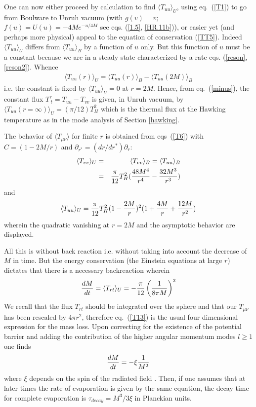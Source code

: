 \documentclass[12pt,oneside]{report}
\begin{document}
One can now either proceed by calculation to find $ \langle T_ {uu} \rangle _{U}
$,  using eq.~(\ref{T1}) to go from Boulware to Unruh vacuum (with $ g(v) = v; $ $
f(u) = U(u) = - 4M e^{-u/4M}$
 see eqs. (\ref{1.5}, \ref{HR.11b})), or easier yet (and perhaps more physical)
appeal to the equation of conservation (\ref{TT5}). Indeed $\langle T_{uu} \rangle
_{U} $ differs from $\langle T_ {uu} \rangle _{B}$  by a function of $ u$ only.
But this function of $u$ must be a constant because we are in a steady state
characterized by a rate eqs. (\ref{reson}, \ref{reson2}).  Whence
\begin{eqnarray} \langle T_{uu}(r) \rangle _U = \langle T_{uu} (r) \rangle _{B}
- \langle T_{uu}(2 M) \rangle _{B}
 \label {4.54}  \end{eqnarray} i.e. the constant is fixed by $ \langle T_{uu}
\rangle _{U} = 0 $ at $ r = 2M$.  Hence, from eq.~(\ref{minus}), the constant
flux  $ T^r_{\ t}  = T_{uu} - T_{vv}$ is  given, in Unruh vacuum,
 by $\langle T_{uu}(r=\infty) \rangle _{U} = (\pi/12)T^2_H$ which is the thermal
flux at the Hawking temperature as in the mode analysis of Section \ref{hawking}.

The behavior of  $ \langle T_{\mu\nu} \rangle $ for finite $r$ is obtained from 
eqs~(\ref{T6})  with $C = (1 - 2M / r)$ and $  \partial _{r^*} = (d r / d{r}^{*}) 
\partial_r$: \begin{eqnarray} \langle T_{vv} \rangle_U&= &\langle T_{vv}
\rangle_{B} =  \langle T_{uu} \rangle_{B} \nonumber\\&=&{\pi \over 12}T_H^{2} (
 {48 M^4 \over r^4}-{32 M^3 \over r^3}  )\label {T9} \end {eqnarray} and
\begin{eqnarray} \langle T_{uu}\rangle_{U} = {\pi \over 12}T_H^{2} (1 - {2 M\over
r})^2 (1 + {4 M \over r} + {12 M \over r^2}) \label {T10} \end{eqnarray}
wherein the quadratic vanishing at $r=2M$ and the asymptotic behavior are 
displayed.

All this is without back reaction i.e. without taking into account the decrease
of $M$ in time. But the  energy conservation (the Einstein equations at large
$r$) dictates that there is a necessary backreaction wherein
 \begin{eqnarray} {dM \over dt}  =  \langle T_{rt}\rangle _{U}
 = - {\pi \over 12} \left( {1 \over 8 \pi M} \right)^2 \label{T13} \end{eqnarray}
We recall that the flux $T_{rt}$ should be integrated over the sphere and that
our $T_{\mu \nu}$ has been rescaled by  $4 \pi r^2$, therefore eq.~(\ref{T13}) is
the usual four dimensional  expression for the mass loss. Upon correcting for
the existence of the potential barrier and adding the contribution of the higher
angular momentum modes $l\geq 1$ one finds 
 \begin{equation} {d M \over dt} = - \xi {1 \over M^2} \label{T14} \end{equation}
where $\xi $ depends on the spin of the radiated field \cite{page}.  Then, if
one assumes that at later times the rate of evaporation is given by the  same
equation, the decay time for complete evaporation is $ \tau_{decay} = M^3 /3
\xi$ in Planckian units.
\end{document}
